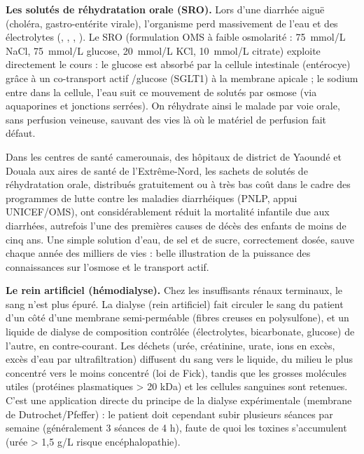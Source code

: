 \documentclass[11pt]{article}
\newcommand{\cle}[1]{{\popxbold\color{popdark}#1}}
\begin{document}
\textbf{Les solutés de réhydratation orale (SRO).} Lors d'une diarrhée aiguë (choléra, gastro-entérite virale), l'organisme perd massivement de l'eau et des électrolytes (, , , ). Le SRO (formulation OMS à faible osmolarité : \SI{75}{mmol/L} NaCl, \SI{75}{mmol/L} glucose, \SI{20}{mmol/L} KCl, \SI{10}{mmol/L} citrate) exploite directement le cours : le glucose est absorbé par la cellule intestinale (entérocye) grâce à un \cle{co-transport actif /glucose} (SGLT1) à la membrane apicale ; le sodium entre dans la cellule, l'eau suit ce mouvement de solutés par \cle{osmose} (via aquaporines et jonctions serrées). On réhydrate ainsi le malade par voie orale, sans perfusion veineuse, sauvant des vies là où le matériel de perfusion fait défaut.

\begin{savaistu}
Dans les centres de santé camerounais, des hôpitaux de district de Yaoundé et Douala aux aires de santé de l'Extrême-Nord, les sachets de solutés de réhydratation orale, distribués gratuitement ou à très bas coût dans le cadre des programmes de lutte contre les maladies diarrhéiques (PNLP, appui UNICEF/OMS), ont considérablement réduit la mortalité infantile due aux diarrhées, autrefois l'une des premières causes de décès des enfants de moins de cinq ans. Une simple solution d'eau, de sel et de sucre, correctement dosée, sauve chaque année des milliers de vies : belle illustration de la puissance des connaissances sur l'osmose et le transport actif.
\end{savaistu}

\textbf{Le rein artificiel (hémodialyse).} Chez les insuffisants rénaux terminaux, le sang n'est plus épuré. La \cle{dialyse} (rein artificiel) fait circuler le sang du patient d'un côté d'une membrane semi-perméable (fibres creuses en polysulfone), et un liquide de dialyse de composition contrôlée (électrolytes, bicarbonate, glucose) de l'autre, en contre-courant. Les déchets (urée, créatinine, urate, ions  en excès, excès d'eau par ultrafiltration) diffusent du sang vers le liquide, du milieu le plus concentré vers le moins concentré (loi de Fick), tandis que les grosses molécules utiles (protéines plasmatiques > 20 kDa) et les cellules sanguines sont retenues. C'est une application directe du principe de la \cle{dialyse} expérimentale (membrane de Dutrochet/Pfeffer) : le patient doit cependant subir plusieurs séances par semaine (généralement 3 séances de 4 h), faute de quoi les toxines s'accumulent (urée > 1,5 g/L risque encéphalopathie).
\end{document}
